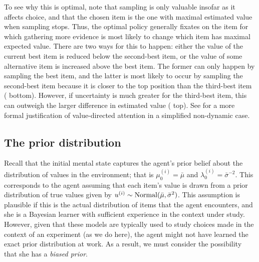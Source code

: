 To see why this is optimal, note that sampling is only valuable insofar as it affects choice, and that the chosen item is the one with maximal estimated value when sampling stops. Thus, the optimal policy generally fixates on the item for which gathering more evidence is most likely to change which item has maximal expected value. There are two ways for this to happen: either the value of the current best item is reduced below the second-best item, or the value of some alternative item is increased above the best item. The former can only happen by sampling the best item, and the latter is most likely to occur by sampling the second-best item because it is closer to the top position than the third-best item ( bottom). However, if uncertainty is much greater for the third-best item, this can outweigh the larger difference in estimated value ( top). See \citet{sepulveda2020visual} for a more formal justification of value-directed attention in a simplified non-dynamic case.

\subsection{The prior distribution}\label{sec:attention-prior}
Recall that the initial mental state captures the agent's prior belief about the distribution of values in the environment; that is $\mu_0^{(i)} = \bar{\mu}$ and $\lambda_0^{(i)} = \bar{\sigma}^{-2}$. This corresponds to the agent assuming that each item's value is drawn from a prior distribution of true values given by $u^{(i)} \sim \mathrm{Normal}(\bar{\mu}, \bar{\sigma}^2)$. This assumption is plausible if this is the actual distribution of items that the agent encounters, and she is a Bayesian learner with sufficient experience in the context under study. However, given that these models are typically used to study choices made in the context of an experiment (as we do here), the agent might not have learned the exact prior distribution at work. As a result, we must consider the possibility that she has a \emph{biased prior}.


